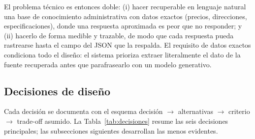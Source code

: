 \documentclass[11pt,a4paper]{article}
\begin{document}
El problema técnico es entonces doble: (i) hacer recuperable en lenguaje
natural una base de conocimiento administrativa con datos exactos (precios,
direcciones, especificaciones), donde una respuesta aproximada es peor que no
responder; y (ii) hacerlo de forma medible y trazable, de modo que cada
respuesta pueda rastrearse hasta el campo del JSON que la respalda. El
requisito de datos exactos condiciona todo el diseño: el sistema prioriza
extraer literalmente el dato de la fuente recuperada antes que parafrasearlo
con un modelo generativo.

\subsection{Decisiones de diseño}

Cada decisión se documenta con el esquema decisión $\rightarrow$ alternativas
$\rightarrow$ criterio $\rightarrow$ trade-off asumido. La
Tabla~\ref{tab:decisiones} resume las seis decisiones principales; las
subsecciones siguientes desarrollan las menos evidentes.
\end{document}
